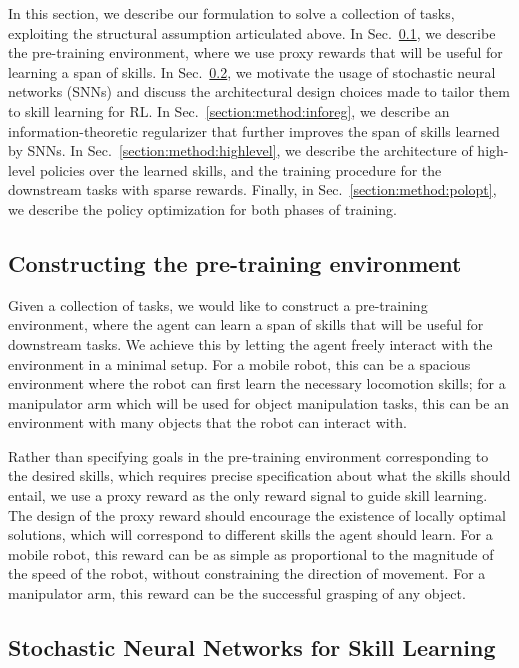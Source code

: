 \documentclass{article} %
\begin{document}
In this section, we describe our formulation to solve a collection of tasks, exploiting the structural assumption articulated above. In Sec.~\ref{section:method:pretraining}, we describe the pre-training environment, where we use proxy rewards that will be useful for learning a span of skills. In Sec.~\ref{section:method:snn}, we motivate the usage of stochastic neural networks (SNNs) and discuss the architectural design choices made to tailor them to skill learning for RL. 
In Sec.~\ref{section:method:inforeg}, we describe an information-theoretic regularizer that further improves the span of skills learned by SNNs. In Sec.~\ref{section:method:highlevel}, we describe the architecture of high-level policies over the learned skills, and the training procedure for the downstream tasks with sparse rewards. Finally, in Sec.~\ref{section:method:polopt}, we describe the policy optimization for both phases of training.

\subsection{Constructing the pre-training environment}
\label{section:method:pretraining}

Given a collection of tasks, we would like to construct a pre-training environment, where the agent can learn a span of skills that will be useful for downstream tasks. We achieve this by letting the agent freely interact with the environment in a minimal setup.
For a mobile robot, this can be a spacious environment where the robot can first learn the necessary locomotion skills; for a manipulator arm which will be used for object manipulation tasks, this can be an environment with many objects that the robot can interact with.

Rather than specifying goals in the pre-training environment corresponding to the desired skills, which requires precise specification about what the skills should entail, we use a proxy reward as the only reward signal to guide skill learning.
The design of the proxy reward should encourage the existence of locally optimal solutions, which will correspond to different skills the agent should learn.
For a mobile robot, this reward can be as simple as proportional to the magnitude of the speed of the robot, without constraining the direction of movement.
For a manipulator arm, this reward can be the successful grasping of any object.

\subsection{Stochastic Neural Networks for Skill Learning}
\label{section:method:snn}
\end{document}
